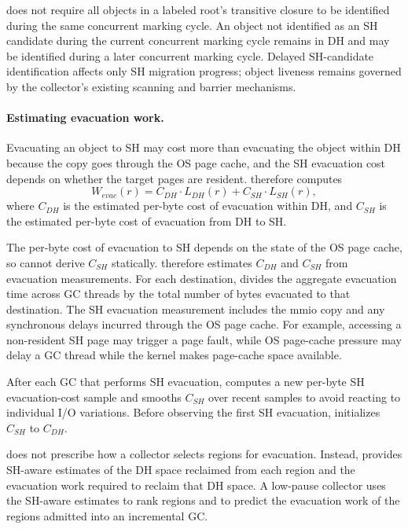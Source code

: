 \chipperName{} does not require all objects in a labeled root's transitive closure to be identified during the same concurrent marking cycle.
An object not identified as an SH candidate during the current concurrent marking cycle remains in DH and may be identified during a later concurrent marking cycle.
Delayed SH-candidate identification affects only SH migration progress; object liveness remains governed by the collector's existing scanning and barrier mechanisms.

\paragraph{\textbf{Estimating evacuation work.}}
Evacuating an object to SH may cost more than evacuating the object within DH because the copy goes through the OS page cache, and the SH evacuation cost depends on whether the target pages are resident.
\chipperName{} therefore computes
%
\begin{equation}
	W_{\mathit{evac}}(r) = C_{DH} \cdot L_{DH}(r) + C_{SH} \cdot L_{SH}(r),
\end{equation}
%
where $C_{DH}$ is the estimated per-byte cost of evacuation within DH, and $C_{SH}$ is the estimated per-byte cost of evacuation from DH to SH.

The per-byte cost of evacuation to SH depends on the state of the OS page cache, so \chipperName{} cannot derive $C_{SH}$ statically.
\chipperName{} therefore estimates $C_{DH}$ and $C_{SH}$ from evacuation measurements.
For each destination, \chipperName{} divides the aggregate evacuation time across GC threads by the total number of bytes evacuated to that destination.
The SH evacuation measurement includes the mmio copy and any synchronous delays incurred through the OS page cache.
For example, accessing a non-resident SH page may trigger a page fault, while OS page-cache pressure may delay a GC thread while the kernel makes page-cache space available.

After each GC that performs SH evacuation, \chipperName{} computes a new per-byte SH evacuation-cost sample and smooths $C_{SH}$ over recent samples to avoid reacting to individual I/O variations.
Before observing the first SH evacuation, \chipperName{} initializes $C_{SH}$ to $C_{DH}$.

\chipperName{} does not prescribe how a collector selects regions for evacuation.
Instead, \chipperName{} provides SH-aware estimates of the DH space reclaimed from each region and the evacuation work required to reclaim that DH space.
A low-pause collector uses the SH-aware estimates to rank regions and to predict the evacuation work of the regions admitted into an incremental GC.

